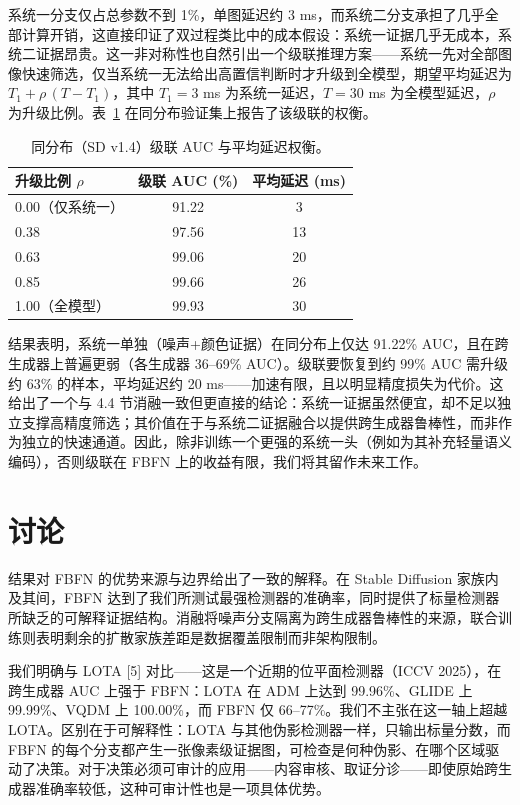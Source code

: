 \documentclass[11pt]{ctexart}
\begin{document}
系统一分支仅占总参数不到 1\%，单图延迟约 3 ms，而系统二分支承担了几乎全部计算开销，这直接印证了双过程类比中的成本假设：系统一证据几乎无成本，系统二证据昂贵。这一非对称性也自然引出一个级联推理方案——系统一先对全部图像快速筛选，仅当系统一无法给出高置信判断时才升级到全模型，期望平均延迟为 $T_1 + \rho\,(T - T_1)$，其中 $T_1 = 3$ ms 为系统一延迟，$T = 30$ ms 为全模型延迟，$\rho$ 为升级比例。表~\ref{tab:cascade} 在同分布验证集上报告了该级联的权衡。

\begin{table}[h]
\centering
\caption{同分布（SD v1.4）级联 AUC 与平均延迟权衡。}
\label{tab:cascade}
\begin{tabular}{lcc}
\toprule
升级比例 $\rho$ & 级联 AUC (\%) & 平均延迟 (ms) \\
\midrule
0.00（仅系统一） & 91.22 & 3 \\
0.38 & 97.56 & 13 \\
0.63 & 99.06 & 20 \\
0.85 & 99.66 & 26 \\
1.00（全模型） & 99.93 & 30 \\
\bottomrule
\end{tabular}
\end{table}

结果表明，系统一单独（噪声+颜色证据）在同分布上仅达 91.22\% AUC，且在跨生成器上普遍更弱（各生成器 36--69\% AUC）。级联要恢复到约 99\% AUC 需升级约 63\% 的样本，平均延迟约 20 ms——加速有限，且以明显精度损失为代价。这给出了一个与 4.4 节消融一致但更直接的结论：系统一证据虽然便宜，却不足以独立支撑高精度筛选；其价值在于与系统二证据融合以提供跨生成器鲁棒性，而非作为独立的快速通道。因此，除非训练一个更强的系统一头（例如为其补充轻量语义编码），否则级联在 FBFN 上的收益有限，我们将其留作未来工作。

\section{讨论}

结果对 FBFN 的优势来源与边界给出了一致的解释。在 Stable Diffusion 家族内及其间，FBFN 达到了我们所测试最强检测器的准确率，同时提供了标量检测器所缺乏的可解释证据结构。消融将噪声分支隔离为跨生成器鲁棒性的来源，联合训练则表明剩余的扩散家族差距是数据覆盖限制而非架构限制。

我们明确与 LOTA [5] 对比——这是一个近期的位平面检测器（ICCV 2025），在跨生成器 AUC 上强于 FBFN：LOTA 在 ADM 上达到 99.96\%、GLIDE 上 99.99\%、VQDM 上 100.00\%，而 FBFN 仅 66--77\%。我们不主张在这一轴上超越 LOTA。区别在于可解释性：LOTA 与其他伪影检测器一样，只输出标量分数，而 FBFN 的每个分支都产生一张像素级证据图，可检查是何种伪影、在哪个区域驱动了决策。对于决策必须可审计的应用——内容审核、取证分诊——即使原始跨生成器准确率较低，这种可审计性也是一项具体优势。
\end{document}
